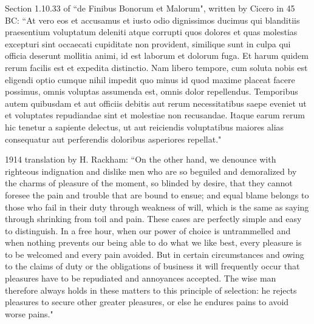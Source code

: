 Section 1.10.33 of ``de Finibus Bonorum et Malorum", written by Cicero in 45 BC: ``At vero eos et accusamus et iusto odio dignissimos ducimus qui blanditiis praesentium voluptatum deleniti atque corrupti quos dolores et quas molestias excepturi sint occaecati cupiditate non provident, similique sunt in culpa qui officia deserunt mollitia animi, id est laborum et dolorum fuga. Et harum quidem rerum facilis est et expedita distinctio. Nam libero tempore, cum soluta nobis est eligendi optio cumque nihil impedit quo minus id quod maxime placeat facere possimus, omnis voluptas assumenda est, omnis dolor repellendus. Temporibus autem quibusdam et aut officiis debitis aut rerum necessitatibus saepe eveniet ut et voluptates repudiandae sint et molestiae non recusandae. Itaque earum rerum hic tenetur a sapiente delectus, ut aut reiciendis voluptatibus maiores alias consequatur aut perferendis doloribus asperiores repellat."

1914 translation by H. Rackham: ``On the other hand, we denounce with righteous indignation and dislike men who are so beguiled and demoralized by the charms of pleasure of the moment, so blinded by desire, that they cannot foresee the pain and trouble that are bound to ensue; and equal blame belongs to those who fail in their duty through weakness of will, which is the same as saying through shrinking from toil and pain. These cases are perfectly simple and easy to distinguish. In a free hour, when our power of choice is untrammelled and when nothing prevents our being able to do what we like best, every pleasure is to be welcomed and every pain avoided. But in certain circumstances and owing to the claims of duty or the obligations of business it will frequently occur that pleasures have to be repudiated and annoyances accepted. The wise man therefore always holds in these matters to this principle of selection: he rejects pleasures to secure other greater pleasures, or else he endures pains to avoid worse pains."

